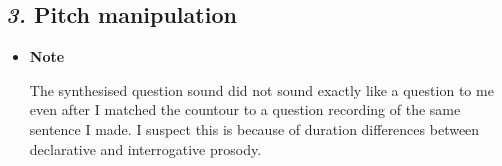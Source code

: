 \documentclass[12pt, english]{article}
\begin{document}

\subsection*{\emph{3.} Pitch manipulation}

\begin{itemize}
    \item \textbf{Note} \par
   The synthesised question sound did not sound exactly like a question to me even after I matched the countour to a question recording of the same sentence I made. I suspect this is because of duration differences between declarative and interrogative prosody.
\end{itemize}

\end{document}
